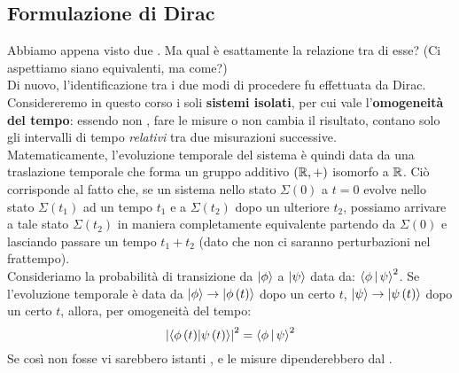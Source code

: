 \documentclass[../../FisicaTeorica.tex]{subfiles}
\begin{document}
\subsection{Formulazione di Dirac}
Abbiamo appena visto due . Ma qual è esattamente la relazione tra di esse? (Ci aspettiamo siano equivalenti, ma come?)\\
Di nuovo, l'identificazione tra i due modi di procedere fu effettuata da Dirac.\\
Considereremo in questo corso i soli \textbf{sistemi isolati}, per cui vale l'\textbf{omogeneità del tempo}: essendo non , fare le misure  o  non cambia il risultato, contano solo gli intervalli di tempo \textit{relativi} tra due misurazioni successive.\\ Matematicamente, l'evoluzione temporale del sistema è quindi data da una traslazione temporale che forma un gruppo additivo $(\mathbb{R},+)$ isomorfo a $\mathbb{R}$.
Ciò corrisponde al fatto che, se un sistema nello stato $\Sigma(0)$ a $t=0$ evolve nello stato $\Sigma\left(t_1\right)$ ad un tempo $t_1$ e a $\Sigma\left(t_2\right)$ dopo un ulteriore $t_2$, possiamo arrivare a tale stato  $\Sigma(t_2)$ in maniera completamente equivalente partendo da $\Sigma(0)$ e lasciando passare un tempo $t_1+t_2$ (dato che non ci saranno perturbazioni nel frattempo).\\

Consideriamo la probabilità di transizione da $\Ket{\phi}$ a $\Ket{\psi}$ data da: $\Braket{\phi|\psi}^2$. 
Se l'evoluzione temporale è data da $\Ket{\phi}\to \Ket{\phi \left(t\right)}$ dopo un certo $t$, $\Ket{\psi}\to \Ket{\psi\left(t\right)}$ dopo un certo $t$, allora, per omogeneità del tempo:
\[
\left|\left\langle\phi\left(t\right)\middle|\psi\left(t\right)\right\rangle\right|^2=\Braket{\phi|\psi}^2
\]
Se così non fosse vi sarebbero istanti , e le misure dipenderebbero dal .\\
\end{document}
